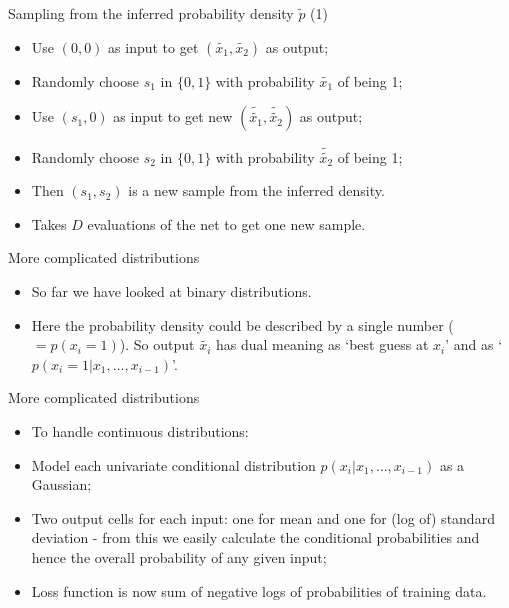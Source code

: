 \documentclass[usenames,dvipsnames]{beamer}
\begin{document}
\begin{frame}{Sampling from the inferred probability density $\tilde{p}$ (1)}
    \begin{itemize}
      \item{Use $(0, 0)$ as input to get $(\tilde{x_1}, \tilde{x_2})$ as output;}
	\item{Randomly choose $s_1$ in $\{0, 1\}$ with probability $\tilde{x_1}$ of being 1;}
	\item{Use $(s_1, 0)$ as input to get new $(\tilde{\tilde{x_1}}, \tilde{\tilde{x_2}})$ as output;}
	\item{Randomly choose $s_2$ in $\{0, 1\}$ with probability $\tilde{\tilde{x_2}}$ of being 1;}
	\item{Then $(s_1, s_2)$ is a new sample from the inferred density.}
	\item{Takes $D$ evaluations of the net to get one new sample.}
    \end{itemize}
\end{frame}


\begin{frame}{More complicated distributions}
    \begin{itemize}
      \item{So far we have looked at binary distributions.}
	\item{Here the probability density could be described by a single number ($= p(x_i = 1)$). So output $\tilde{x_i}$ has dual meaning as `best guess at $x_i$' and as `$p(x_i = 1 | x_1, \dots, x_{i-1})$'.}
    \end{itemize}
\end{frame}

\begin{frame}{More complicated distributions}
    \begin{itemize}
      \item{To handle continuous distributions:}
	\item{Model each univariate conditional distribution $p(x_i | x_1, \dots, x_{i-1})$ as a Gaussian;}
	\item{Two output cells for each input: one for mean and one for (log of) standard deviation - from this we easily calculate the conditional probabilities and hence the overall probability of any given input;}
	\item{Loss function is now sum of negative logs of probabilities of training data.}
    \end{itemize}
\end{frame}
\end{document}
